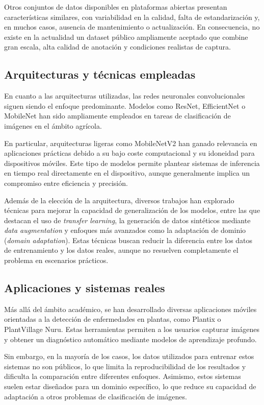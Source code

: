 \documentclass[12pt,a4paper]{article}
\begin{document}
Otros conjuntos de datos disponibles en plataformas abiertas presentan características similares, con variabilidad en la calidad, falta de estandarización y, en muchos casos, ausencia de mantenimiento o actualización. En consecuencia, no existe en la actualidad un dataset público ampliamente aceptado que combine gran escala, alta calidad de anotación y condiciones realistas de captura.

\subsection{Arquitecturas y técnicas empleadas}

En cuanto a las arquitecturas utilizadas, las redes neuronales convolucionales siguen siendo el enfoque predominante. Modelos como ResNet, EfficientNet o MobileNet han sido ampliamente empleados en tareas de clasificación de imágenes en el ámbito agrícola.

En particular, arquitecturas ligeras como MobileNetV2 han ganado relevancia en aplicaciones prácticas debido a su bajo coste computacional y su idoneidad para dispositivos móviles. Este tipo de modelos permite plantear sistemas de inferencia en tiempo real directamente en el dispositivo, aunque generalmente implica un compromiso entre eficiencia y precisión.

Además de la elección de la arquitectura, diversos trabajos han explorado técnicas para mejorar la capacidad de generalización de los modelos, entre las que destacan el uso de \textit{transfer learning}, la generación de datos sintéticos mediante \textit{data augmentation} y enfoques más avanzados como la adaptación de dominio (\textit{domain adaptation}). Estas técnicas buscan reducir la diferencia entre los datos de entrenamiento y los datos reales, aunque no resuelven completamente el problema en escenarios prácticos.

\subsection{Aplicaciones y sistemas reales}

Más allá del ámbito académico, se han desarrollado diversas aplicaciones móviles orientadas a la detección de enfermedades en plantas, como Plantix o PlantVillage Nuru. Estas herramientas permiten a los usuarios capturar imágenes y obtener un diagnóstico automático mediante modelos de aprendizaje profundo.

Sin embargo, en la mayoría de los casos, los datos utilizados para entrenar estos sistemas no son públicos, lo que limita la reproducibilidad de los resultados y dificulta la comparación entre diferentes enfoques. Asimismo, estos sistemas suelen estar diseñados para un dominio específico, lo que reduce su capacidad de adaptación a otros problemas de clasificación de imágenes.
\end{document}
